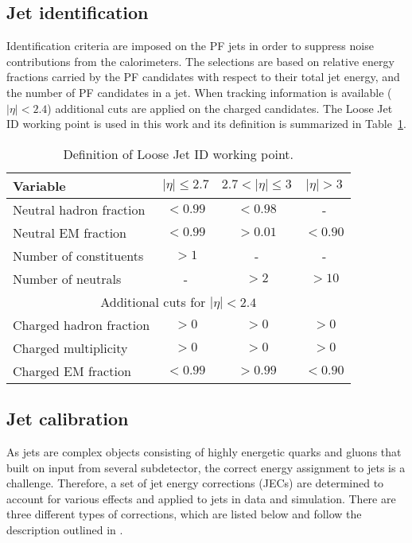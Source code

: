 \subsection*{Jet identification}
\noindent\justify
Identification criteria are imposed on the PF jets in order to suppress noise contributions from the calorimeters. 
The selections are based on relative energy fractions carried by the PF candidates with respect to their total jet energy, and the number of PF candidates in a jet. 
When tracking information is available ($|\eta|<2.4$) additional cuts are applied on the charged candidates.  
The Loose Jet ID working point is used in this work and its definition is summarized in Table~\ref{tab:jetId}. 
\begin{table}[ht!]
\def\arraystretch{1.2}
    \caption{Definition of Loose Jet ID working point.}
    \label{tab:jetId}
    \begin{center}
        \begin{tabular}{ l c c c }
        \hline \hline
        Variable               &  $|\eta|\leq2.7$&  $2.7<|\eta|\leq3$ &  $|\eta|>3$     \\ \hline
        Neutral hadron fraction & $<0.99$   & $<0.98$  & -      \\
        Neutral EM fraction & $<0.99$   & $>0.01$  & $<0.90$      \\
        Number of constituents & $>1$    & -  & -      \\
        Number of neutrals & -    & $>2$  & $>10$      \\
        \multicolumn{4}{c}{Additional cuts for $|\eta|<2.4$}                \\
        Charged hadron fraction & $>0$   & $>0$  & $>0$      \\
        Charged multiplicity & $>0$   & $>0$  & $>0$      \\
        Charged EM fraction & $<0.99$   & $>0.99$  & $<0.90$      \\
\hline\hline
\end{tabular}
\end{center}
\end{table}                                                                                                   
\subsection*{Jet calibration}\label{sec:JEC}
\noindent\justify
As jets are complex objects consisting of highly energetic quarks and gluons that built on input from several subdetector, the correct energy assignment to jets is a challenge. 
Therefore, a set of jet energy corrections (JECs) are determined to account for various effects and applied to jets in data and simulation. 
There are three different types of corrections, which are listed below and follow the description outlined in \cite{Khachatryan:2016kdb}. 
